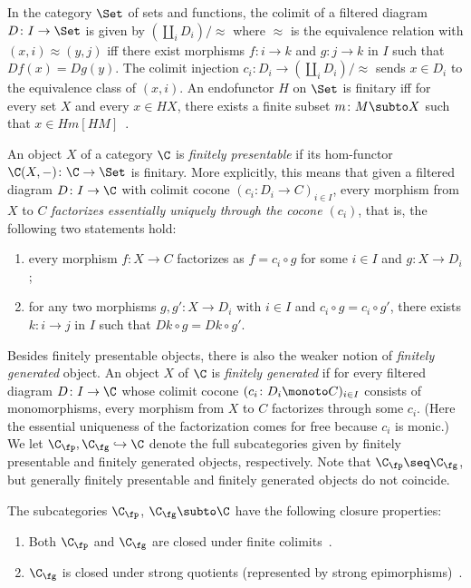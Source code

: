 \documentclass[a4paper,UKenglish, autoref, numberwithinsect, final]{lipics-v2021}
\numberwithin{equation}{section}
\newcommand{\resetCurThmBraces}{%
  \gdef\curThmBraceOpen{(}%
  \gdef\curThmBraceClose{)}}
\newcommand{\removeThmBraces}{%
  \gdef\curThmBraceOpen{}%
  \gdef\curThmBraceClose{}}
\newenvironment{notheorembrackets}{\removeThmBraces}{\resetCurThmBraces}
\theoremstyle{plain}
\theoremstyle{definition}
\begin{document}
\begin{example}\label{ex:filtered-set}
In the category $\Set$ of sets and functions, the colimit of a filtered diagram $D\colon I\to \Set$ is given by $(\coprod_i D_i)/{\approx}$ where $\approx$ is the equivalence relation with  $(x,i)\approx (y,j)$ iff there exist morphisms $f\colon i\to k$ and $g\colon j\to k$ in $I$ such that $Df(x)=Dg(y)$. The colimit injection $c_i\colon D_i\to (\coprod_i D_i)/{\approx}$ sends $x\in D_i$ to the equivalence class of $(x,i)$. An endofunctor $H$ on $\Set$ is finitary iff for every set $X$ and every $x\in HX$, there exists a finite subset $m\colon M\subto X$ such that $x\in Hm[HM]$~\cite[Rem.\ 3.14]{amsw19}.
\end{example}

An object $X$ of a category $\C$ is \emph{finitely presentable} if its hom-functor $\C(X,-)\colon \C\to \Set$ is finitary. More explicitly, this means that given a filtered diagram $D\colon I\to \C$ with colimit cocone $(c_i\colon D_i\to C)_{i\in I}$, every morphism from $X$ to $C$ \emph{factorizes essentially uniquely through the cocone $(c_i)$}, that is, the following two statements hold:
\begin{enumerate}
\item every morphism $f\colon X\to C$ factorizes as $f=c_i\circ g$ for some $i\in I$ and $g\colon X\to D_i$;
\item for any two morphisms $g,g'\colon X\to D_i$ with $i\in I$ and $c_i\circ g = c_i\circ g'$, there exists $k\colon i\to j$ in $I$ such that $Dk\circ g = Dk\circ g'$.
\end{enumerate}
Besides finitely presentable objects, there is also the weaker notion of \emph{finitely generated} object. An object $X$ of $\C$ is \emph{finitely generated} if for every filtered diagram $D\colon I\to \C$ whose colimit cocone $(c_i\colon D_i\monoto C)_{i\in I}$ consists of monomorphisms, every morphism from $X$ to $C$ factorizes through some $c_i$. (Here the essential uniqueness of the factorization comes for free because $c_i$ is monic.) We let $\C_\fp,\C_\fg\hookrightarrow \C$ denote the full subcategories given by finitely presentable and finitely generated objects, respectively. Note that $\C_\fp\seq \C_\fg$, but generally finitely presentable and finitely generated objects do not coincide. 

\begin{notheorembrackets}
\begin{lemma}\label{lem:fp-fp-fin-colimits} The subcategories $\C_\fp$, $\C_\fg \subto \C$ have the following closure properties:
\begin{enumerate}
\item Both $\C_\fp$ and $\C_\fg$ are closed under finite colimits~\cite[Prop.~1.3]{adamek_rosicky_1994}. 
\item $\C_\fg$ is closed under strong quotients (represented by strong epimorphisms)~\cite[Prop.~1.69]{adamek_rosicky_1994}.
\end{enumerate}
\end{lemma}
\end{notheorembrackets}
\end{document}
